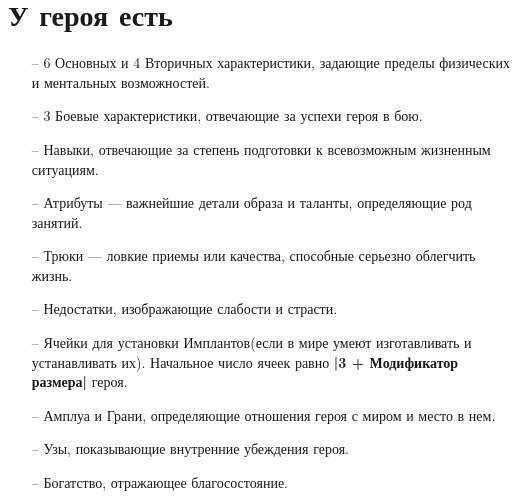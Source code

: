 \section{У героя есть}
\begin{itemize}
\item[--] 6 Основных и 4 Вторичных характеристики, задающие пределы физических и ментальных возможностей.
\item[--] 3 Боевые характеристики, отвечающие за успехи героя в бою.
\item[--] Навыки, отвечающие за степень подготовки к всевозможным жизненным ситуациям.
\item[--] Атрибуты — важнейшие детали образа и таланты, определяющие род занятий.
\item[--] Трюки — ловкие приемы или качества, способные серьезно облегчить жизнь.
\item[--] Недостатки, изображающие слабости и страсти.
\item[--] Ячейки для установки Имплантов(если в мире умеют изготавливать и устанавливать их). Начальное число ячеек равно \textbf{|3 + Модификатор размера|} героя.
\item[--] Амплуа и Грани, определяющие отношения героя с миром и место в нем.
\item[--] Узы, показывающие внутренние убеждения героя.
\item[--] Богатство, отражающее благосостояние.
\end{itemize}
